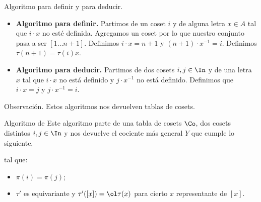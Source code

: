 \documentclass[aspectratio=169, 9pt]{beamer}
\begin{document}
\begin{frame}[fragile]{Algoritmo para definir y para deducir.}
	\begin{itemize}
		\item \textbf{Algoritmo para definir.} 
		Partimos de un coset $i$ y de alguna letra $x \in A$ tal que $i \cdot x$ no esté definida.
		Agregamos un coset por lo que nuestro conjunto pasa a ser $[1 \dots n+1]$. 
		Definimos $i \cdot x = n+1$ y $(n+1) \cdot x^{-1} = i$.
		Definimos $\tau(n+1) = \tau (i) x$.
		\pause
		\item \textbf{Algoritmo para deducir.} Partimos de dos cosets $i,j \in \In$ y de una letra $x$ tal que $i \cdot x$ no está definido y $j \cdot x^{-1}$ no está definido.
		Definimos que $i \cdot x = j$ y $j \cdot x^{-1} = i$.
	\end{itemize}
	
	
	\pause
	\begin{alertblock}{Observación.}
		Estos algoritmos nos devuelven tablas de cosets.
	\end{alertblock}
\end{frame}

\begin{frame}[fragile]{Algoritmo de \coin}
	Este algoritmo parte de una tabla de cosets $\Co$, dos cosets distintos $i,j \in \In$ y nos devuelve el cociente más general $Y$ que cumple lo siguiente,
		\begin{center}
					{\large {}}
		\end{center}
	\pause
		tal que:
		\begin{itemize}
			\item $\pi(i) = \pi(j)$;
			\item $\tau'$ es equivariante y $\tau' ([x]) = \ol\tau(x)$ para cierto $x$ representante de  $[x]$. 
		\end{itemize}
\end{frame}
\end{document}
